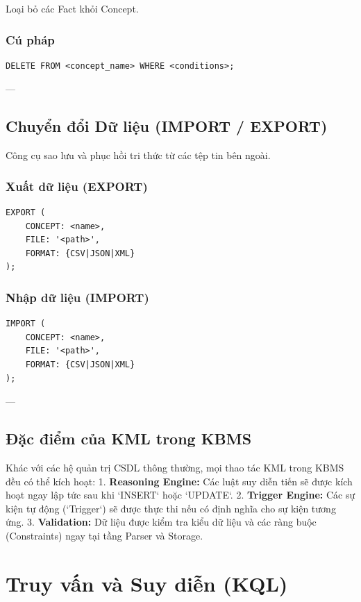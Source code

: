 Loại bỏ các Fact khỏi Concept.

\subsubsection{Cú pháp}
\begin{verbatim}
DELETE FROM <concept_name> WHERE <conditions>;
\end{verbatim}

---

\subsection{Chuyển đổi Dữ liệu (IMPORT / EXPORT)}

Công cụ sao lưu và phục hồi tri thức từ các tệp tin bên ngoài.

\subsubsection{Xuất dữ liệu (EXPORT)}
\begin{verbatim}
EXPORT (
    CONCEPT: <name>, 
    FILE: '<path>', 
    FORMAT: {CSV|JSON|XML}
);
\end{verbatim}

\subsubsection{Nhập dữ liệu (IMPORT)}
\begin{verbatim}
IMPORT (
    CONCEPT: <name>, 
    FILE: '<path>', 
    FORMAT: {CSV|JSON|XML}
);
\end{verbatim}

---

\subsection{Đặc điểm của KML trong KBMS}

Khác với các hệ quản trị CSDL thông thường, mọi thao tác KML trong KBMS đều có thể kích hoạt:
1.  \textbf{Reasoning Engine:} Các luật suy diễn tiến sẽ được kích hoạt ngay lập tức sau khi `INSERT` hoặc `UPDATE`.
2.  \textbf{Trigger Engine:} Các sự kiện tự động (`Trigger`) sẽ được thực thi nếu có định nghĩa cho sự kiện tương ứng.
3.  \textbf{Validation:} Dữ liệu được kiểm tra kiểu dữ liệu và các ràng buộc (Constraints) ngay tại tầng Parser và Storage.

\section{Truy vấn và Suy diễn (KQL)}

